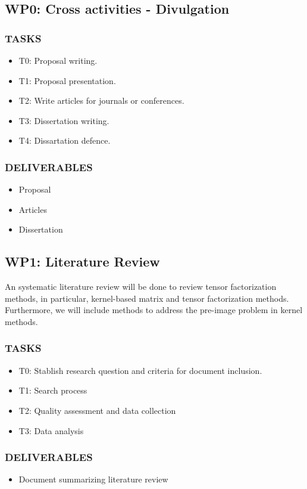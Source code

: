 \documentclass[letterpaper,12pt]{article}
\begin{document}
\subsection*{WP0: Cross activities - Divulgation}
\subsubsection*{TASKS }
\begin{itemize}
\item T0: Proposal writing.
\item T1: Proposal presentation.
\item T2: Write articles for journals or conferences.
\item T3: Dissertation writing.
\item T4: Dissartation defence.
\end{itemize}
\subsubsection*{DELIVERABLES }
\begin{itemize}
 \item Proposal
 \item Articles
 \item Dissertation
\end{itemize}



\subsection*{WP1: Literature Review}
An systematic literature review will be done to review tensor factorization methods, in particular, 
kernel-based matrix and tensor factorization methods. Furthermore, we will include methods to address the pre-image problem in kernel methods.
\subsubsection*{TASKS }
\begin{itemize}
\item T0: Stablish research question and criteria for document inclusion.
\item T1: Search process
\item T2: Quality assessment and data collection
\item T3: Data analysis
\end{itemize}
\subsubsection*{DELIVERABLES }
\begin{itemize}
\item Document summarizing literature review
\end{itemize}
\end{document}
